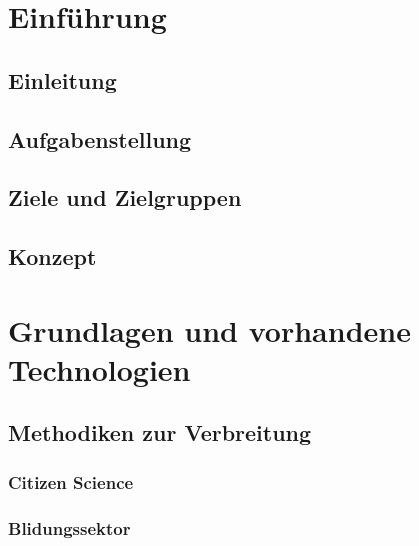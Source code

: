 \documentclass[12pt]{article}
\begin{document}
\newpage %
\ofoot{\pagemark}

\section{Einf\"uhrung}
\label{sec:introduction}

\subsection{Einleitung}


\subsection{Aufgabenstellung}


\subsection{Ziele und Zielgruppen}


\subsection{Konzept}


\newpage %

\section{Grundlagen und vorhandene Technologien}
%

\newpage %
\subsection{Methodiken zur Verbreitung}
%
\newpage

\subsubsection{Citizen Science}
%

\newpage
\subsubsection{Blidungssektor}
%
\end{document}
